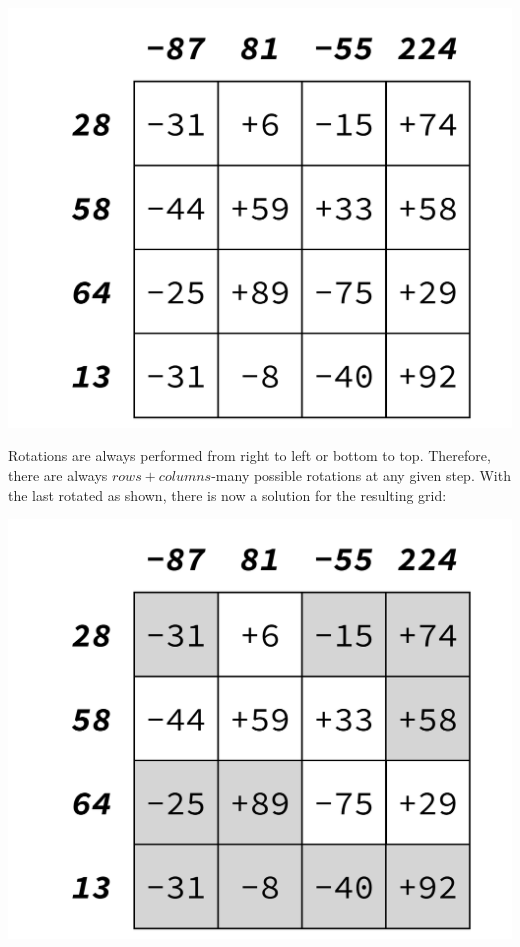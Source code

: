 \begin{center}
	\includegraphics[scale=0.4,trim=0 30 0 30]{cswk/lac3r.pdf}
\end{center}
Rotations are always performed from right to left or bottom to top. Therefore, there are always $\mathit{rows}+\mathit{columns}$-many possible rotations at any given step. With the last rotated as shown, there is now a solution for the resulting grid:
\begin{center}
	\includegraphics[scale=0.4,trim=0 30 0 30]{cswk/lac3s.pdf}
\end{center}
